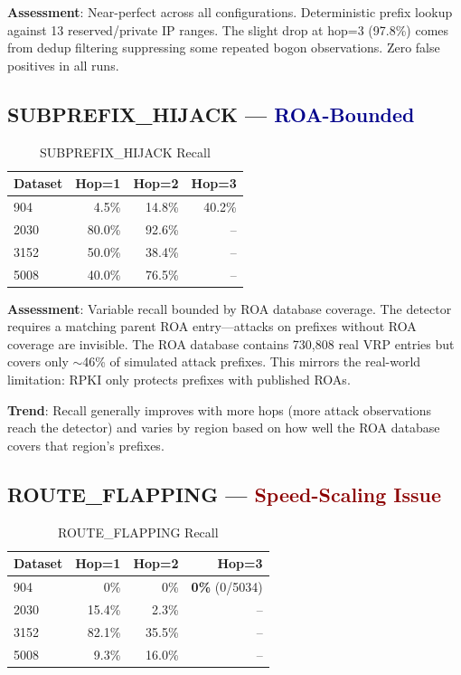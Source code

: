 \documentclass[11pt,a4paper]{article}
\begin{document}
\textbf{Assessment}: Near-perfect across all configurations. Deterministic prefix
lookup against 13 reserved/private IP ranges. The slight drop at hop=3 (97.8\%)
comes from dedup filtering suppressing some repeated bogon observations.
Zero false positives in all runs.

\subsection{SUBPREFIX\_HIJACK --- \textcolor{darkblue}{ROA-Bounded}}

\begin{table}[H]
\centering
\caption{SUBPREFIX\_HIJACK Recall}
\begin{tabular}{l|rrr}
\toprule
\textbf{Dataset} & \textbf{Hop=1} & \textbf{Hop=2} & \textbf{Hop=3} \\
\midrule
904   & 4.5\%   & 14.8\% & 40.2\% \\
2030  & 80.0\%  & 92.6\% & -- \\
3152  & 50.0\%  & 38.4\% & -- \\
5008  & 40.0\%  & 76.5\% & -- \\
\bottomrule
\end{tabular}
\end{table}

\textbf{Assessment}: Variable recall bounded by ROA database coverage. The detector
requires a matching parent ROA entry---attacks on prefixes without ROA coverage
are invisible. The ROA database contains 730,808 real VRP entries but covers
only $\sim$46\% of simulated attack prefixes. This mirrors the real-world limitation:
RPKI only protects prefixes with published ROAs.

\textbf{Trend}: Recall generally improves with more hops (more attack observations
reach the detector) and varies by region based on how well the ROA database covers
that region's prefixes.

\subsection{ROUTE\_FLAPPING --- \textcolor{darkred}{Speed-Scaling Issue}}

\begin{table}[H]
\centering
\caption{ROUTE\_FLAPPING Recall}
\begin{tabular}{l|rrr}
\toprule
\textbf{Dataset} & \textbf{Hop=1} & \textbf{Hop=2} & \textbf{Hop=3} \\
\midrule
904   & 0\%    & 0\%   & \textbf{0\%} (0/5034) \\
2030  & 15.4\% & 2.3\% & -- \\
3152  & 82.1\% & 35.5\% & -- \\
5008  & 9.3\%  & 16.0\% & -- \\
\bottomrule
\end{tabular}
\end{table}
\end{document}
